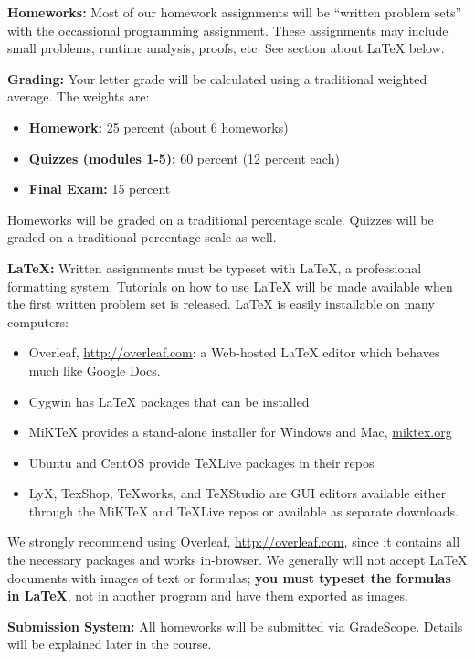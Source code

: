 \documentclass[12pt]{article}
\begin{document}
\textbf{Homeworks:} Most of our homework assignments will be ``written problem sets'' with the occassional programming assignment. These assignments may include small problems, runtime analysis, proofs, etc.   See section about \LaTeX{} below.

\textbf{Grading:} Your letter grade will be calculated using a traditional weighted average. The weights are:

\begin{itemize}
\item \textbf{Homework:} 25 percent (about 6 homeworks)
\item \textbf{Quizzes (modules 1-5):} 60 percent (12 percent each)
\item \textbf{Final Exam:} 15 percent
\end{itemize}

Homeworks will be graded on a traditional percentage scale. Quizzes will be graded on a traditional percentage scale as well.


\textbf{\LaTeX:} Written assignments must be typeset with \LaTeX, a professional formatting system. Tutorials on how to use \LaTeX{} will be made available when the first written problem set is released. \LaTeX{} is easily installable on many computers: 
\begin{itemize}
    \item Overleaf, \url{http://overleaf.com}: a Web-hosted \LaTeX{} editor which behaves much like Google Docs.
    \item Cygwin has \LaTeX{} packages that can be installed
    \item MiKTeX provides a stand-alone installer for Windows and Mac, \url{miktex.org}
    \item Ubuntu and CentOS provide TeXLive packages in their repos
    \item LyX, TexShop, TeXworks, and TeXStudio are GUI editors available either through the MiKTeX and TeXLive repos or available as separate downloads.
\end{itemize}
We strongly recommend using Overleaf, \url{http://overleaf.com}, since it contains all the necessary packages and works in-browser. We generally will not accept \LaTeX{} documents with images of text or formulas; \textbf{you must typeset the formulas in \LaTeX}, not in another program and have them exported as images.

\textbf{Submission System:} All homeworks will be submitted via GradeScope. Details will be explained later in the course. 
\end{document}
